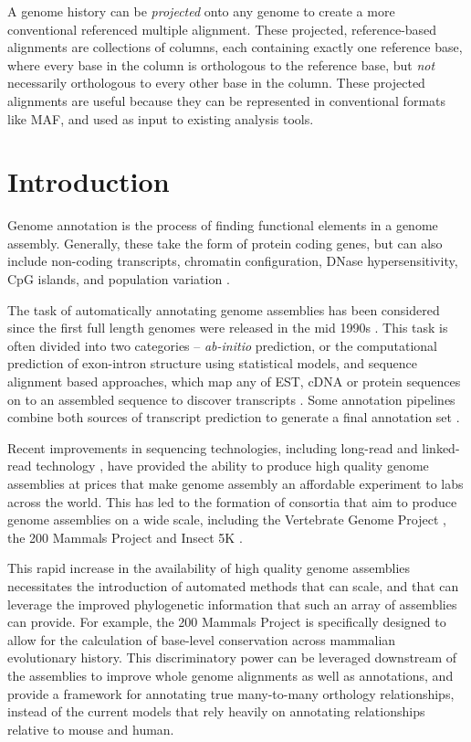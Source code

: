 \documentclass[fleqn,10pt]{wlscirep}
\begin{document}
A genome history can be \emph{projected} onto any genome to create a more conventional referenced multiple alignment.
These projected, reference-based alignments are collections of columns, each containing exactly one reference base, where every base in the column is orthologous to the reference base, but \emph{not} necessarily orthologous to every other base in the column.
These projected alignments are useful because they can be represented in conventional formats like MAF, and used as input to existing analysis tools.

\section*{Introduction}

Genome annotation is the process of finding functional elements in a genome assembly. Generally, these take the form of protein coding genes, but can also include non-coding transcripts\cite{harrow2012gencode}, chromatin configuration, DNase hypersensitivity\cite{encode2004encode}, CpG islands, and population variation \cite{sherry2001dbsnp}.

The task of automatically annotating genome assemblies has been considered since the first full length genomes were released in the mid 1990s \cite{letovsky1998gdb,lukashin1998genemark,haussler1996generalized}. This task is often divided into two categories -- \textit{ab-initio} prediction, or the computational prediction of exon-intron structure using statistical models, and sequence alignment based approaches, which map any of EST, cDNA or protein sequences on to an assembled sequence to discover transcripts \cite{Aken01012016}. Some annotation pipelines combine both sources of transcript prediction to generate a final annotation set \cite{pruitt2006ncbi,cantarel2008maker}.

Recent improvements in sequencing technologies, including long-read \cite{gordon2016long} and linked-read technology \cite{10xassembly}, have provided the ability to produce high quality genome assemblies at prices that make genome assembly an affordable experiment to labs across the world. This has led to the formation of consortia that aim to produce genome assemblies on a wide scale, including the Vertebrate Genome Project \cite{haussler2009genome}, the 200 Mammals Project and Insect 5K \cite{robinson2011creating}.

This rapid increase in the availability of high quality genome assemblies necessitates the introduction of automated methods that can scale, and that can leverage the improved phylogenetic information that such an array of assemblies can provide. For example, the 200 Mammals Project is specifically designed to allow for the calculation of base-level conservation across mammalian evolutionary history. This discriminatory power can be leveraged downstream of the assemblies to improve whole genome alignments as well as annotations, and provide a framework for annotating true many-to-many orthology relationships, instead of the current models that rely heavily on annotating relationships relative to mouse and human.
\end{document}
